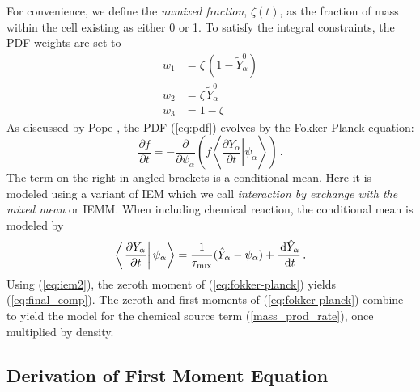 For convenience, we define the \emph{unmixed fraction}, $\zeta(t)$, as the fraction of mass within the cell existing as either 0 or 1.  To satisfy the integral constraints, the PDF weights are set to
\begin{align}
w_1 &= \zeta \, (1 - \widetilde{Y}_\alpha^0) \\
w_2 &= \zeta \, \widetilde{Y}_\alpha^0 \\
w_3 &= 1-\zeta
\end{align}
As discussed by Pope \cite{Pope:2000}, the PDF (\ref{eq:pdf}) evolves by the Fokker-Planck equation:
\begin{equation}
\label{eq:fokker-planck}
\frac{\partial f}{\partial t} = -\frac{\partial}{\partial \psi_\alpha} \left(f \left\langle \left. \frac{\partial Y_\alpha}{\partial t} \right| \psi_\alpha \right\rangle \right) \,\mbox{.}
\end{equation}
The term on the right in angled brackets is a conditional mean.  Here it is modeled using a variant of IEM \cite{Dopazo:1974} which we call {\em interaction by exchange with the mixed mean} or IEMM.  When including chemical reaction, the conditional mean is modeled by
\begin{equation}
\label{eq:iem2}
\left\langle \left. \frac{\partial Y_\alpha}{\partial t} \right| \psi_\alpha \right\rangle = \frac{1}{\tau_{\rm mix}}(\hat{Y}_\alpha - \psi_\alpha) + \frac{\,\mathrm{d} \hat{Y}_\alpha}{\,\mathrm{d} t} \,\mbox{.}
\end{equation}
Using (\ref{eq:iem2}), the zeroth moment of (\ref{eq:fokker-planck}) yields (\ref{eq:final_comp}).  The zeroth and first moments of (\ref{eq:fokker-planck}) combine to yield the model for the chemical source term (\ref{mass_prod_rate}), once multiplied by density.

\subsection*{Derivation of First Moment Equation}

